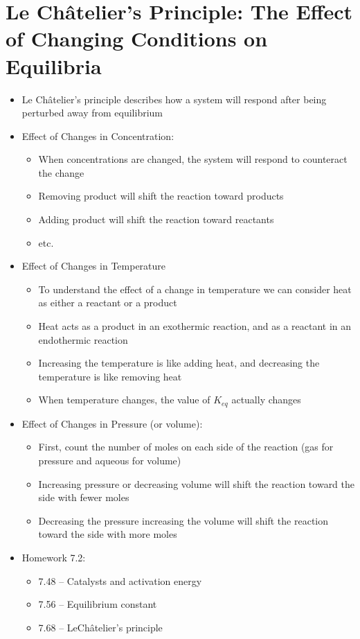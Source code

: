 \documentclass[12pt, openany, letterpaper]{memoir}
\begin{document}
\section{Le Ch\^atelier's Principle: The Effect of Changing Conditions on Equilibria}
\begin{itemize}
	\item Le Ch\^atelier's principle describes how a system will respond after being perturbed away from equilibrium
	\item Effect of Changes in Concentration:
	      \begin{itemize}
		      \item When concentrations are changed, the system will respond to counteract the change
		      \item Removing product will shift the reaction toward products
		      \item Adding product will shift the reaction toward reactants
		      \item etc.
	      \end{itemize}
	\item Effect of Changes in Temperature
	      \begin{itemize}
		      \item To understand the effect of a change in temperature we can consider heat as either a reactant or a product
		      \item Heat acts as a product in an exothermic reaction, and as a reactant in an endothermic reaction
		      \item Increasing the temperature is like adding heat, and decreasing the temperature is like removing heat
		      \item When temperature changes, the value of $K_{eq}$ actually changes
	      \end{itemize}
	\item Effect of Changes in Pressure (or volume):
	      \begin{itemize}
		      \item First, count the number of moles on each side of the reaction (gas for pressure and aqueous for volume)
		      \item Increasing pressure or decreasing volume will shift the reaction toward the side with fewer moles
		      \item Decreasing the pressure increasing the volume will shift the reaction toward the side with more moles
	      \end{itemize}
	\item Homework 7.2:
	      \begin{itemize}
		      \item 7.48 -- Catalysts and activation energy
		      \item 7.56 -- Equilibrium constant
		      \item 7.68 -- LeCh\^atelier's principle
	      \end{itemize}
\end{itemize}
\end{document}
